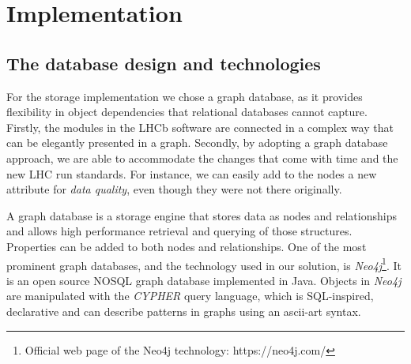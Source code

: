 \section{Implementation}

\subsection{The database design and technologies}

For the storage implementation we chose a graph database, as it provides flexibility in object dependencies that relational databases cannot capture. Firstly, the modules in the LHCb software are connected in a complex way that can be elegantly presented in a graph. Secondly, by adopting a graph database approach, we are able to accommodate the changes that come with time and the new LHC run standards. For instance, we can easily add to the nodes a new attribute for \emph{data quality}, even though they were not there originally.

A graph database is a storage engine that stores data as nodes and relationships and allows high performance retrieval and querying of those structures. Properties can be added to both nodes and relationships. One of the most prominent graph databases, and the technology used in our solution, is \emph{Neo4j}\footnote{Official web page of the Neo4j technology: https://neo4j.com/}. It is an open source NOSQL graph database implemented in Java. Objects in \emph{Neo4j} are manipulated with the \emph{CYPHER} query language, which is SQL-inspired, declarative and can describe patterns in graphs using an ascii-art syntax.


